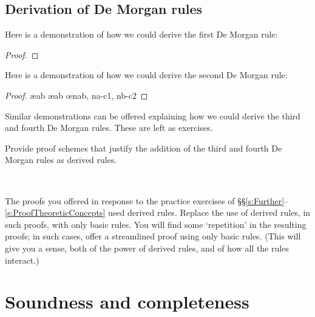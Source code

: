 \section{Derivation of De Morgan rules}
Here is a demonstration of how we could derive the first De Morgan rule:
 	\begin{proof}
		\LEM
		\open
			\open
			\close
		\close
		\open
		\close
	\end{proof}
Here is a demonstration of how we could derive the second De Morgan rule:
 	\begin{proof}
		\open
			\ae{ab}
			\ae{ab}
			\open
			\close
			\open
			\close
			\oe{nab, na-c1, nb-c2}
		\close
	\end{proof}
Similar demonstrations can be offered explaining how we could derive the third and fourth De Morgan rules. These are left as exercises.

\practiceproblems

\problempart
Provide proof schemes that justify the addition of the third and fourth De Morgan rules as derived rules. 

\

\problempart
The proofs you offered in response to the practice exercises of \S\S\ref{s:Further}--\ref{s:ProofTheoreticConcepts} used derived rules. Replace the use of derived rules, in such proofs, with only basic rules. You will find some `repetition' in the resulting proofs; in such cases, offer a streamlined proof using only basic rules.  (This will give you a sense, both of the power of derived rules, and of how all the rules interact.)

\chapter{Soundness and completeness}
\label{sec:soundness_and_completeness}

